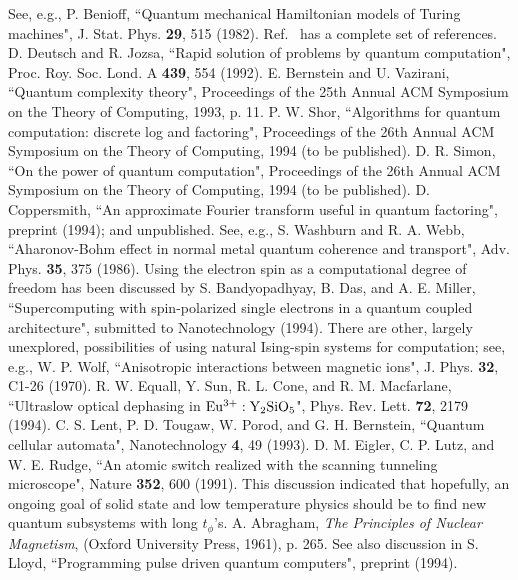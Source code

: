 \begin{references}
 See, e.g., P. Benioff, ``Quantum mechanical Hamiltonian
models of Turing machines", J. Stat. Phys. {\bf 29}, 515 (1982).
Ref.~\cite{Landaue} has a complete set of references.
 D. Deutsch and R. Jozsa, ``Rapid solution of problems by
quantum computation", Proc. Roy. Soc. Lond. A {\bf 439}, 554 (1992).
 E. Bernstein and U. Vazirani, ``Quantum complexity theory",
Proceedings of the 25th Annual ACM Symposium on the Theory of Computing,
1993, p. 11.
 P. W. Shor, ``Algorithms for quantum computation:
discrete log and factoring", Proceedings of the 26th Annual ACM Symposium
on the Theory of Computing, 1994 (to be published).
 D. R. Simon, ``On the power of quantum computation",
Proceedings of the 26th Annual ACM Symposium on the Theory of Computing,
1994 (to be published).
 D. Coppersmith, ``An approximate Fourier
transform useful in quantum factoring", preprint (1994); and unpublished.
 See, e.g., S. Washburn and R. A. Webb, ``Aharonov-Bohm effect
in normal metal quantum coherence and transport", Adv. Phys. {\bf 35},
375 (1986).
 Using the electron spin as a computational degree of
freedom has been discussed by
S. Bandyopadhyay, B. Das, and A. E. Miller,
``Supercomputing with spin-polarized single electrons in a quantum
coupled architecture", submitted to Nanotechnology (1994).  There are other,
largely unexplored, possibilities of using natural Ising-spin systems
for computation; see, e.g., W. P. Wolf, ``Anisotropic interactions between
magnetic ions", J. Phys. {\bf 32}, C1-26 (1970).
 R. W. Equall, Y. Sun, R. L. Cone, and R. M. Macfarlane,
``Ultraslow optical dephasing in ${\rm Eu^{3+}:Y_2SiO_5}$", Phys.
Rev. Lett. {\bf 72}, 2179 (1994).
 C. S. Lent, P. D. Tougaw, W. Porod, and G. H. Bernstein,
``Quantum cellular automata", Nanotechnology {\bf 4}, 49 (1993).
 D. M. Eigler, C. P. Lutz, and W. E. Rudge, ``An atomic switch
realized with the scanning tunneling microscope", Nature {\bf 352}, 600 (1991).
 This discussion indicated that hopefully, an
ongoing goal of solid state and low temperature physics should
be to find new quantum subsystems with long $t_\phi$'s.
 A. Abragham, {\em The Principles of Nuclear Magnetism},
(Oxford University Press, 1961), p. 265.
 See also discussion in S. Lloyd, ``Programming
pulse driven quantum computers", preprint (1994).

\end{references}

